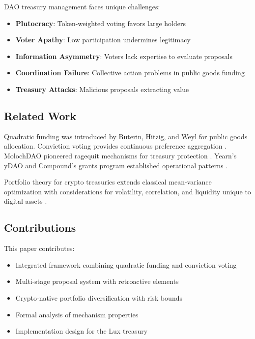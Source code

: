 \documentclass[11pt,a4paper]{article}
\theoremstyle{definition}
\theoremstyle{remark}
\begin{document}
DAO treasury management faces unique challenges:

\begin{itemize}
    \item \textbf{Plutocracy}: Token-weighted voting favors large holders
    \item \textbf{Voter Apathy}: Low participation undermines legitimacy
    \item \textbf{Information Asymmetry}: Voters lack expertise to evaluate proposals
    \item \textbf{Coordination Failure}: Collective action problems in public goods funding
    \item \textbf{Treasury Attacks}: Malicious proposals extracting value
\end{itemize}

\subsection{Related Work}

Quadratic funding was introduced by Buterin, Hitzig, and Weyl \cite{buterin2018qf} for public goods allocation. Conviction voting provides continuous preference aggregation \cite{conviction2019}. MolochDAO pioneered ragequit mechanisms for treasury protection \cite{moloch2019}. Yearn's yDAO and Compound's grants program established operational patterns \cite{yearn2021, compound2021}.

Portfolio theory for crypto treasuries extends classical mean-variance optimization \cite{markowitz1952} with considerations for volatility, correlation, and liquidity unique to digital assets \cite{liu2021crypto}.

\subsection{Contributions}

This paper contributes:
\begin{itemize}
    \item Integrated framework combining quadratic funding and conviction voting
    \item Multi-stage proposal system with retroactive elements
    \item Crypto-native portfolio diversification with risk bounds
    \item Formal analysis of mechanism properties
    \item Implementation design for the Lux treasury
\end{itemize}
\end{document}
